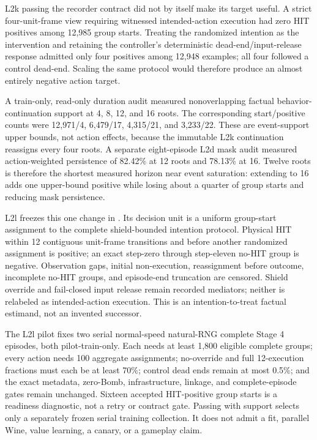 \documentclass[11pt]{article}
\begin{document}
L2k passing the recorder contract did not by itself make its target useful.
A strict four-unit-frame view requiring witnessed intended-action execution had
zero HIT positives among 12,985 group starts.  Treating the randomized
intention as the intervention and retaining the controller's deterministic
dead-end/input-release response admitted only four positives among 12,948
examples; all four followed a control dead-end.  Scaling the same protocol
would therefore produce an almost entirely negative action target.

A train-only, read-only duration audit measured nonoverlapping factual
behavior-continuation support at 4, 8, 12, and 16 roots.  The corresponding
start/positive counts were 12,971/4, 6,479/17, 4,315/21, and 3,233/22.  These
are event-support upper bounds, not action effects, because the immutable L2k
continuation reassigns every four roots.  A separate eight-episode L2d mask
audit measured action-weighted persistence of 82.42\% at 12 roots and 78.13\%
at 16.  Twelve roots is therefore the shortest measured horizon near event
saturation: extending to 16 adds one upper-bound positive while losing about a
quarter of group starts and reducing mask persistence.

L2l freezes this one change in
.  Its decision unit is a
uniform group-start assignment to the complete shield-bounded intention
protocol.  Physical HIT within 12 contiguous unit-frame transitions and before
another randomized assignment is positive; an exact step-zero through
step-eleven no-HIT group is negative.  Observation gaps, initial
non-execution, reassignment before outcome, incomplete no-HIT groups, and
episode-end truncation are censored.  Shield override and fail-closed input
release remain recorded mediators; neither is relabeled as intended-action
execution.  This is an intention-to-treat factual estimand, not an invented
successor.

The L2l pilot fixes two serial normal-speed natural-RNG complete Stage 4
episodes, both pilot-train-only.  Each needs at least 1,800 eligible complete
groups; every action needs 100 aggregate assignments; no-override and full
12-execution fractions must each be at least 70\%; control dead ends remain at
most 0.5\%; and the exact metadata, zero-Bomb, infrastructure, linkage, and
complete-episode gates remain unchanged.  Sixteen accepted HIT-positive group
starts is a readiness diagnostic, not a retry or contract gate.  Passing with
support selects only a separately frozen serial training collection.  It does
not admit a fit, parallel Wine, value learning, a canary, or a gameplay claim.
\end{document}
